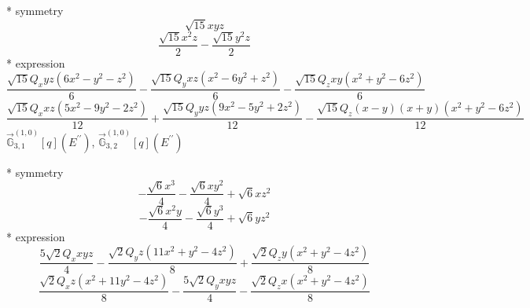 \documentclass[fleqn,8pt]{jsarticle}
\begin{document}
\noindent\quad ** symmetry
\begin{dmath*}
\sqrt{15} x y z
\end{dmath*}
\begin{dmath*}
\frac{\sqrt{15} x^{2} z}{2} - \frac{\sqrt{15} y^{2} z}{2}
\end{dmath*}
\noindent\quad ** expression
\begin{dmath*}
\frac{\sqrt{15} Q_{x} y z \left(6 x^{2} - y^{2} - z^{2}\right)}{6} - \frac{\sqrt{15} Q_{y} x z \left(x^{2} - 6 y^{2} + z^{2}\right)}{6} - \frac{\sqrt{15} Q_{z} x y \left(x^{2} + y^{2} - 6 z^{2}\right)}{6}
\end{dmath*}
\begin{dmath*}
\frac{\sqrt{15} Q_{x} x z \left(5 x^{2} - 9 y^{2} - 2 z^{2}\right)}{12} + \frac{\sqrt{15} Q_{y} y z \left(9 x^{2} - 5 y^{2} + 2 z^{2}\right)}{12} - \frac{\sqrt{15} Q_{z} \left(x - y\right) \left(x + y\right) \left(x^{2} + y^{2} - 6 z^{2}\right)}{12}
\end{dmath*}
\noindent\quad $\vec{\mathbb{G}}_{3,1}^{(1,0)}[q](E^{\prime\prime})$, $\vec{\mathbb{G}}_{3,2}^{(1,0)}[q](E^{\prime\prime})$

\noindent\quad ** symmetry
\begin{dmath*}
- \frac{\sqrt{6} x^{3}}{4} - \frac{\sqrt{6} x y^{2}}{4} + \sqrt{6} x z^{2}
\end{dmath*}
\begin{dmath*}
- \frac{\sqrt{6} x^{2} y}{4} - \frac{\sqrt{6} y^{3}}{4} + \sqrt{6} y z^{2}
\end{dmath*}
\noindent\quad ** expression
\begin{dmath*}
\frac{5 \sqrt{2} Q_{x} x y z}{4} - \frac{\sqrt{2} Q_{y} z \left(11 x^{2} + y^{2} - 4 z^{2}\right)}{8} + \frac{\sqrt{2} Q_{z} y \left(x^{2} + y^{2} - 4 z^{2}\right)}{8}
\end{dmath*}
\begin{dmath*}
\frac{\sqrt{2} Q_{x} z \left(x^{2} + 11 y^{2} - 4 z^{2}\right)}{8} - \frac{5 \sqrt{2} Q_{y} x y z}{4} - \frac{\sqrt{2} Q_{z} x \left(x^{2} + y^{2} - 4 z^{2}\right)}{8}
\end{dmath*}
\end{document}
